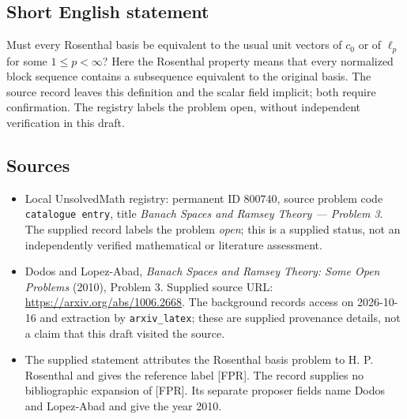 \documentclass[11pt]{article}
\begin{document}
\subsection{Short English statement}
Must every Rosenthal basis be equivalent to the usual unit vectors of \(c_0\) or of \(\ell_p\) for some \(1\leq p<\infty\)? Here the Rosenthal property means that every normalized block sequence contains a subsequence equivalent to the original basis. The source record leaves this definition and the scalar field implicit; both require confirmation. The registry labels the problem open, without independent verification in this draft.
\subsection{Sources}
\begin{itemize}
\item Local UnsolvedMath registry: permanent ID \(800740\), source problem code \texttt{catalogue entry}, title \emph{Banach Spaces and Ramsey Theory --- Problem 3}. The supplied record labels the problem \emph{open}; this is a supplied status, not an independently verified mathematical or literature assessment.
\item Dodos and Lopez-Abad, \emph{Banach Spaces and Ramsey Theory: Some Open Problems} (2010), Problem 3. Supplied source URL: \url{https://arxiv.org/abs/1006.2668}. The background records access on 2026-10-16 and extraction by \texttt{arxiv\_latex}; these are supplied provenance details, not a claim that this draft visited the source.
\item The supplied statement attributes the Rosenthal basis problem to H. P. Rosenthal and gives the reference label [FPR]. The record supplies no bibliographic expansion of [FPR]. Its separate proposer fields name Dodos and Lopez-Abad and give the year 2010.
\end{itemize}
\end{document}
